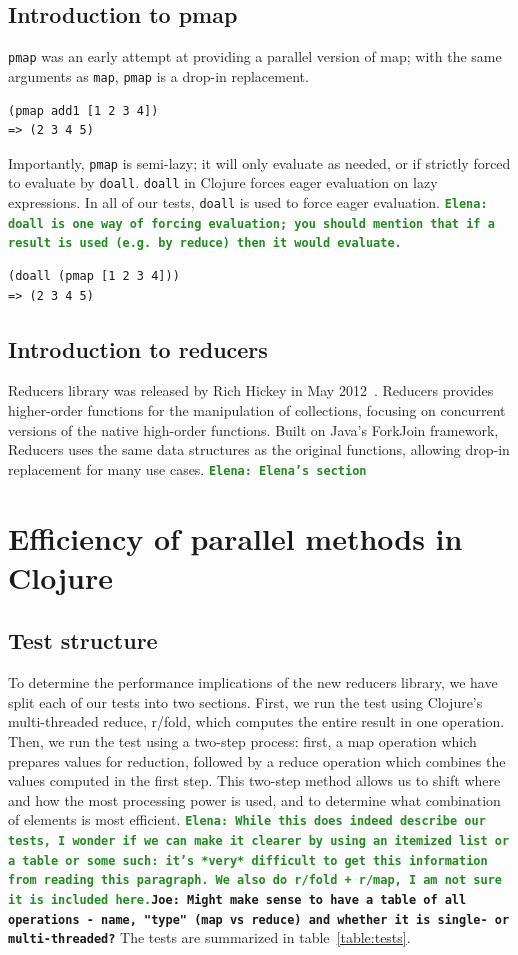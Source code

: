 \documentclass[12pt]{article}
\newcommand{\comment}[1]{{\bf \tt  {#1}}}
\newcommand{\emcomment}[1]{\textcolor{ForestGreen}{\comment{Elena: {#1}}}}
\newcommand{\joecomment}[1]{\textcolor{JoesGold}{\comment{Joe: {#1}}}}
\newcommand{\clocode}[1]{{\texttt {#1}}}
\begin{document}
\subsection{Introduction to pmap}\label{sec:pmap}
\clocode{pmap} was an early attempt at providing a parallel version of map; with the same arguments as \clocode{map}, \clocode{pmap} is a drop-in replacement. 
\begin{verbatim}
(pmap add1 [1 2 3 4])
=> (2 3 4 5)
\end{verbatim}
Importantly, \clocode{pmap} is semi-lazy; it will only evaluate as needed, or if strictly forced to evaluate by \clocode{doall}. \clocode{doall} in Clojure forces eager evaluation on lazy expressions. In all of our tests, \clocode{doall} is used to force eager evaluation. \emcomment{doall is one way of forcing evaluation; you should mention that if a result is used (e.g. by reduce) then it would evaluate. }
\begin{verbatim}
(doall (pmap [1 2 3 4])) 
=> (2 3 4 5)
\end{verbatim}

\subsection{Introduction to reducers}\label{sec:reducers}
Reducers library was released by Rich Hickey in May 2012~\cite{HickeyReducers}. Reducers provides higher-order functions for the manipulation of collections, focusing on concurrent versions of the native high-order functions.  Built on Java's ForkJoin framework, Reducers uses the same data structures as the original functions, allowing drop-in replacement for many use cases.
\emcomment{Elena's section}

\section{Efficiency of parallel methods in Clojure}\label{sec:efficiency} 

\subsection{Test structure}\label{sec:testStruct}
To determine the performance implications of the new reducers library, we have split each of our tests into two sections. First, we run the test using Clojure's multi-threaded reduce, r/fold, which computes the entire result in one operation. Then, we run the test using a two-step process: first, a map operation which prepares values for reduction, followed by a reduce operation which combines the values computed in the first step. This two-step method allows us to shift where and how the most processing power is used, and to determine what combination of elements is most efficient.
\emcomment{While this does indeed describe our tests, I wonder if we can make it clearer by using an itemized list or a table or some such: it's *very* difficult to get this information from reading this paragraph. We also do r/fold + r/map, I am not sure it is included here.}\joecomment{Might make sense to have a table of all operations - name, "type" (map vs reduce) and whether it is single- or multi-threaded?}
The tests are summarized in table~\ref{table:tests}.
\end{document}
